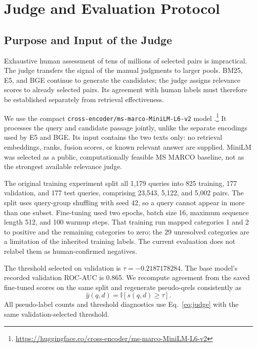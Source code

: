 \documentclass[runningheads,a4paper]{llncs}
\begin{document}
\section{Judge and Evaluation Protocol}
\label{sec:protocol}

\subsection{Purpose and Input of the Judge}
\label{sec:judge-method}

Exhaustive human assessment of tens of millions of selected pairs is impractical. The judge transfers the signal of the manual judgments to larger pools. BM25, E5, and BGE continue to generate the candidates; the judge assigns relevance scores to already selected pairs. Its agreement with human labels must therefore be established separately from retrieval effectiveness.

We use the compact \texttt{cross-encoder/ms-marco-MiniLM-L6-v2} model \cite{wang2020minilm,reimers2019sentencebert}.\footnote{\url{https://huggingface.co/cross-encoder/ms-marco-MiniLM-L6-v2}} It processes the query and candidate passage jointly, unlike the separate encodings used by E5 and BGE. Its input contains the two texts only: no retrieval embeddings, ranks, fusion scores, or known relevant answer are supplied. MiniLM was selected as a public, computationally feasible MS MARCO baseline, not as the strongest available relevance judge.

The original training experiment split all 1,179 queries into 825 training, 177 validation, and 177 test queries, comprising 23,543, 5,122, and 5,002 pairs. The split uses query-group shuffling with seed 42, so a query cannot appear in more than one subset. Fine-tuning used two epochs, batch size 16, maximum sequence length 512, and 100 warmup steps. That training run mapped categories 1 and 2 to positive and the remaining categories to zero; the 29 unresolved categories are a limitation of the inherited training labels. The current evaluation does not relabel them as human-confirmed negatives.

The threshold selected on validation is \(\tau=-0.2187178284\). The base model's recorded validation ROC-AUC is 0.865. We recompute agreement from the saved fine-tuned scores on the same split and regenerate pseudo-qrels consistently as
\begin{equation}
\hat y(q,d)=\mathbb{I}[s(q,d)\geq\tau].
\label{eq:judge}
\end{equation}
All pseudo-label counts and threshold diagnostics use Eq.~\ref{eq:judge} with the same validation-selected threshold.
\end{document}
